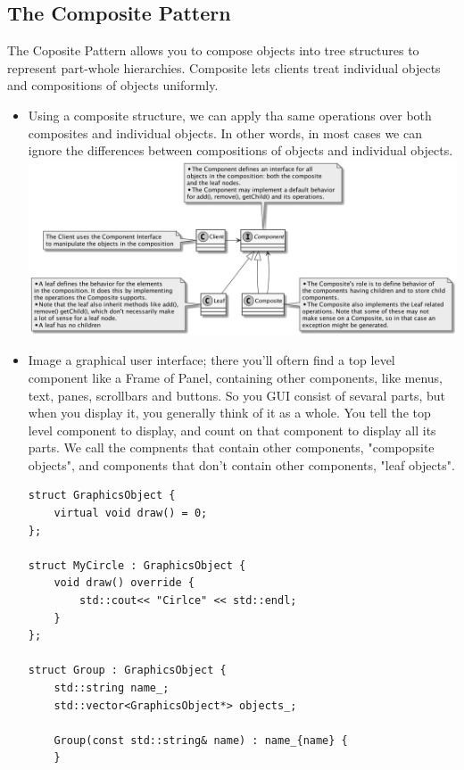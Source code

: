 \documentclass[11pt]{article}
\begin{document}
    \subsection{The Composite Pattern}
    The Coposite Pattern allows you to compose objects into tree structures to represent part-whole hierarchies. Composite
    lets clients treat individual objects and compositions of objects uniformly.
    \begin{itemize}
        \item Using a composite structure, we can apply tha same operations over both composites and individual objects.
        In other words, in most cases we can ignore the differences between compositions of objects and individual objects.\\
        \includegraphics[scale=0.15]{composite/1__composite_pattern}
        \item Image a graphical user interface; there you'll oftern find a top level component like a Frame of Panel, containing
        other components, like menus, text, panes, scrollbars and buttons. So you GUI consist of sevaral parts, but when you display
        it, you generally think of it as a whole. You tell the top level component to display, and count on that component to
        display all its parts. We call the compnents that contain other components, "compopsite objects", and components that
        don't contain other components, "leaf objects".
        \begin{multicols}{2}
            \begin{lstlisting}
struct GraphicsObject {
    virtual void draw() = 0;
};

struct MyCircle : GraphicsObject {
    void draw() override {
        std::cout<< "Cirlce" << std::endl;
    }
};

struct Group : GraphicsObject {
    std::string name_;
    std::vector<GraphicsObject*> objects_;

    Group(const std::string& name) : name_{name} {
    }


\end{lstlisting}
\end{multicols}
\end{itemize}
\end{document}

